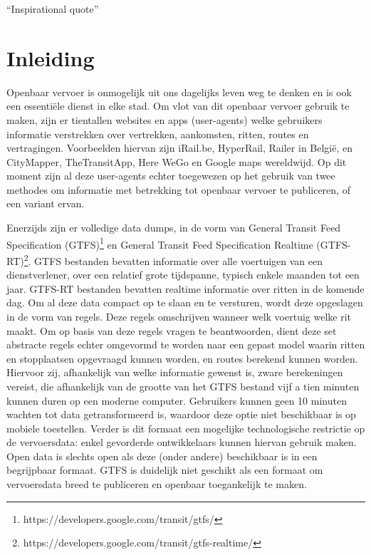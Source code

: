 \begin{savequote}[0.55\linewidth]
	``Inspirational quote''
\end{savequote}

\chapter{Inleiding}
\label{chap:intro}
Openbaar vervoer is onmogelijk uit ons dagelijks leven weg te denken en is ook een essentiële dienst in elke stad\citep{programmableweb14}. Om vlot van dit openbaar vervoer gebruik te maken, zijn er tientallen websites en apps (user-agents) welke gebruikers informatie verstrekken over vertrekken, aankomsten, ritten, routes en vertragingen. Voorbeelden hiervan zijn iRail.be, HyperRail, Railer in België, en CityMapper, TheTransitApp, Here WeGo en Google maps wereldwijd. Op dit moment zijn al deze user-agents echter toegewezen op het gebruik van twee methodes om informatie met betrekking tot openbaar vervoer te publiceren, of een variant ervan. 

Enerzijds zijn er volledige data dumps, in de vorm van General Transit Feed Specification (GTFS)\footnote{https://developers.google.com/transit/gtfs/} en General Transit Feed Specification Realtime (GTFS-RT)\footnote{https://developers.google.com/transit/gtfs-realtime/}. GTFS bestanden bevatten informatie over alle voertuigen van een dienstverlener, over een relatief grote tijdspanne, typisch enkele maanden tot een jaar. GTFS-RT bestanden bevatten realtime informatie over ritten in de komende dag. Om al deze data compact op te slaan en te versturen, wordt deze opgeslagen in de vorm van regels. Deze regels omschrijven wanneer welk voertuig welke rit maakt. Om op basis van deze regels vragen te beantwoorden, dient deze set abstracte regels echter omgevormd te worden naar een gepast model waarin ritten en stopplaatsen opgevraagd kunnen worden, en routes berekend kunnen worden. Hiervoor zij, afhankelijk van welke informatie gewenst is, zware berekeningen vereist, die afhankelijk van de grootte van het GTFS bestand vijf a tien minuten kunnen duren op een moderne computer. Gebruikers kunnen geen 10 minuten wachten tot data getransformeerd is, waardoor deze optie niet beschikbaar is op mobiele toestellen. Verder is dit formaat een mogelijke technologische restrictie op de vervoersdata: enkel gevorderde ontwikkelaars kunnen hiervan gebruik maken. Open data is slechts open als deze (onder andere) beschikbaar is in een begrijpbaar formaat\citep{okfn18}. GTFS is duidelijk niet geschikt als een formaat om vervoersdata breed te publiceren en openbaar toegankelijk te maken.

